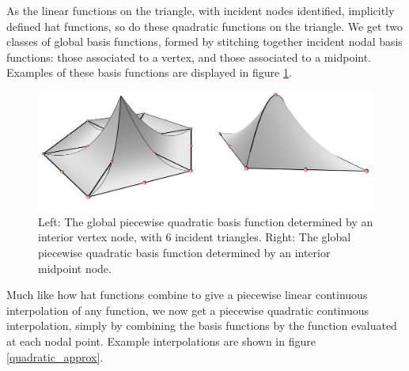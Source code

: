 As the linear functions on the triangle, with incident nodes identified, implicitly defined hat functions,
so do these quadratic functions on the triangle.
We get two classes of global basis functions, formed by stitching together incident nodal basis functions:
those associated to a vertex, and those associated to a midpoint. Examples of these basis functions are displayed in figure
\ref{quadratic_basis_global}.
\begin{figure}[H]
    \begin{center}
        \includegraphics[width=0.8\linewidth]{figures/basis_functions/quadratic_basis_global.png}
    \end{center}
    \caption{\scriptsize
        Left: The global piecewise quadratic basis function determined by an interior vertex node, with 6 incident triangles.
        Right: The global piecewise quadratic basis function determined by an interior midpoint node.
    }
    \label{quadratic_basis_global}
\end{figure}
Much like how hat functions combine to give a piecewise linear continuous interpolation of any function, we now get
a piecewise quadratic continuous interpolation, simply by combining the basis functions by the function evaluated
at each nodal point. Example interpolations are shown in figure
\ref{quadratic_approx}.

